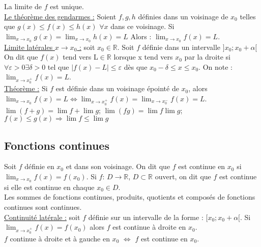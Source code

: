 \documentclass[../main.tex]{subfiles}
\begin{document}
La limite de $f$ est unique. \\

\quad \underline{Le théorème des gendarmes :} Soient $f,g,h$ définies dans un voisinage de $x_0$ telles que $g(x) \leq f(x) \leq h(x)$ $\forall x$ dans ce voisinage. Si $\lim_{x\rightarrow x_0} g(x) = \lim_{x\rightarrow x_0} h(x) = L$ Alors : $\lim_{x\rightarrow x_0} f(x) = L$.\\

\quad \underline{Limite latérales $x \rightarrow x_0$ :} soit $x_0 \in \mathbb{R}$. Soit $f$ définie dans un intervalle $]x_0; x_0+\alpha[$ On dit que $f(x)$ tend vers L$\in \mathbb{R}$ lorsque x tend vers $x_0$ par la droite si $\forall \varepsilon>0 \exists \delta>0$ tel que $|f(x) - L| \leq \varepsilon$ dès que $x_0-\delta \leq x \leq x_0$. On note : $\lim_{x\rightarrow x_0^+} f(x) = L$.\\

\underline{Théorème :} Si $f$ est définie dans un voisinage épointé de $x_0$, alors $\lim_{x\rightarrow x_0} f(x) = L \Leftrightarrow \lim_{x\rightarrow x_0^+} f(x) =\lim_{x\rightarrow x_0^-} f(x) = L$.\\

$\lim (f+g) = \lim f +\lim g$; $\lim (fg) = \lim f \lim g$; $f(x) \leq g(x) \Rightarrow \lim f \leq \lim g$\\

\subsection{Fonctions continues}
Soit $f$ définie en $x_0$ et dans son voisinage. On dit que $f$ est continue en $x_0$ si $\lim_{x\rightarrow x_0} f(x) = f(x_0)$. Si $f$: $D\rightarrow \mathbb{R}$, $D\subset \mathbb{R}$ ouvert, on dit que $f$ est continue si elle est continue en chaque $x_0 \in D$.\\

Les sommes de fonctions continues, produits, quotients et composés de fonctions continues sont continues. \\

\quad \underline{Continuité latérale :} soit $f$ définie sur un intervalle de la forme : $[x_0; x_0+\alpha[$. Si $\lim_{x\rightarrow x_0^+} f(x) = f(x_0)$ alors $f$ est continue à droite en $x_0$.\\

$f$ continue à droite et à gauche en $x_0$ $\Leftrightarrow$ $f$ est continue en $x_0$.\\
\end{document}
